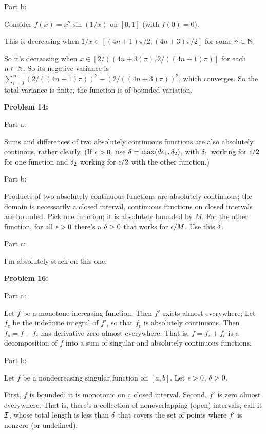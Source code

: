 \documentclass[a4paper,12pt]{article}
\begin{document}
\shunt

Part b:

Consider $f(x) = x^2\sin(1/x)$ on $[0,1]$ (with $f(0)=0$).

This is decreasing when $1/x \in [(4n+1)\pi/2,(4n+3)\pi/2]$ for some $n \in \mathbb{N}$.

So it's decreasing when $x \in [2/((4n+3)\pi),2/((4n+1)\pi)]$ for each $n \in \mathbb{N}$. So its negative variance is $\sum\limits_{i=0}^\infty (2/((4n+1)\pi))^2 - (2/((4n+3)\pi))^2$, which converges. So the total variance is finite, the function is of bounded variation.

\shunt

{\bf Problem 14:}

Part a:

Sums and differences of two absolutely continuous functions are also absolutely continous, rather clearly. (If $\epsilon >0$, use $\delta = \max(de_1,\delta_2)$, with $\delta_1$ working for $\epsilon/2$ for one function and $\delta_2$ working for $\epsilon/2$ with the other function.)

\shunt

Part b:

Products of two absolutely continuous functions are absolutely continuous; the domain is necessarily a closed interval, continuous functions on closed intervals are bounded. Pick one function; it is absolutely bounded by $M$. For the other function, for all $\epsilon >0$ there's a $\delta >0$ that works for $\epsilon/M$. Use this $\delta$.

\shunt

Part c:

I'm absolutely stuck on this one.

\shunt

{\bf Problem 16:}

Part a:

Let $f$ be a monotone increasing function. Then $f'$ exists almost everywhere; Let $f_c$ be the indefinite integral of $f'$, so that $f_c$ is absolutely continuous. Then $f_s=f-f_c$ has derivative zero almost everywhere. That is, $f=f_s+f_c$ is a decomposition of $f$ into a sum of singular and absolutely continuous functions.

\shunt

Part b:

Let $f$ be a nondecreasing singular function on $[a,b]$. Let $\epsilon>0$, $\delta>0$.

First, $f$ is bounded; it is monotonic on a closed interval. Second, $f'$ is zero almost everywhere. That is, there's a collection of nonoverlapping (open) intervals, call it $\mathcal{I}$, whose total length is less than $\delta$ that covers the set of points where $f'$ is nonzero (or undefined).
\end{document}
